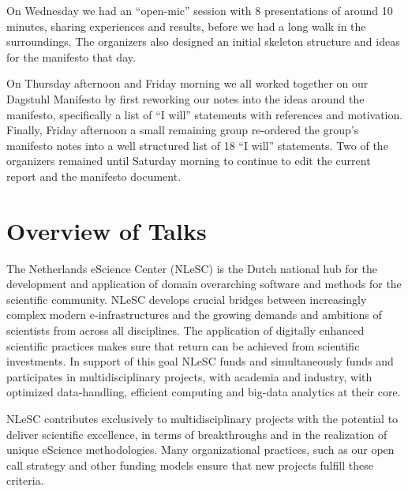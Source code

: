 \documentclass[a4paper,UKenglish]{dagrep}
\begin{document}
On Wednesday we had an ``open-mic'' session with 8 presentations of around 10 minutes, sharing experiences and results, before we had a long walk in the surroundings. The organizers also designed an initial skeleton structure and ideas for the manifesto that day.

On Thursday afternoon and Friday morning we all worked together on our Dagstuhl Manifesto by first reworking our notes into the ideas around the manifesto, specifically a list of ``I will'' statements with references and motivation. Finally, Friday afternoon a small remaining group re-ordered the group's manifesto notes into a well structured list of 18 ``I will'' statements. Two of the organizers remained until Saturday morning to continue to edit the current report and the manifesto document.

\tableofcontents

\section{Overview of Talks}

{}

The Netherlands eScience Center (NLeSC) is the Dutch national hub for
the development and application of domain overarching software and
methods for the scientific community. NLeSC develops crucial bridges
between increasingly complex modern e-infrastructures and the growing
demands and ambitions of scientists from across all disciplines. The
application of digitally enhanced scientific practices makes sure that
return can be achieved from scientific investments. In support of this
goal NLeSC funds and simultaneously funds and participates in
multidisciplinary projects, with academia and industry, with optimized
data-handling, efficient computing and big-data analytics at their
core.

NLeSC contributes exclusively to multidisciplinary projects with the
potential to deliver scientific excellence, in terms of breakthroughs
and in the realization of unique eScience methodologies. Many
organizational practices, such as our open call strategy and other
funding models ensure that new projects fulfill these criteria.
\end{document}
